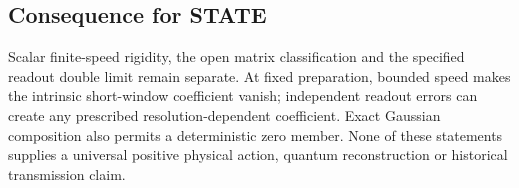 \documentclass[11pt,a4paper]{article}
\begin{document}
\hypertarget{consequence-for-state}{%
\subsection{Consequence for STATE}\label{consequence-for-state}}

Scalar finite-speed rigidity, the open matrix classification and the
specified readout double limit remain separate. At fixed preparation,
bounded speed makes the intrinsic short-window coefficient vanish;
independent readout errors can create any prescribed
resolution-dependent coefficient. Exact Gaussian composition also
permits a deterministic zero member. None of these statements supplies a
universal positive physical action, quantum reconstruction or historical
transmission claim.
\end{document}
